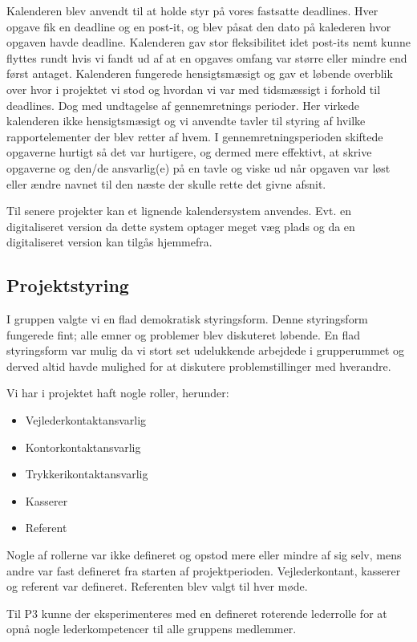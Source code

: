 Kalenderen blev anvendt til at holde styr p\aa{} vores fastsatte deadlines. Hver opgave fik en deadline og en post-it, og blev p\aa{}sat den dato p\aa{} kalederen hvor opgaven havde deadline.
Kalenderen gav stor fleksibilitet idet post-its nemt kunne flyttes rundt hvis vi fandt ud af at en opgaves omfang var st\o{}rre eller mindre end f\o{}rst antaget.
Kalenderen fungerede hensigtsm\ae{}sigt og gav et l\o{}bende overblik over hvor i projektet vi stod og hvordan vi var med tidsm\ae{}ssigt i forhold til deadlines. 
Dog med undtagelse af gennemretnings perioder.
Her virkede kalenderen ikke hensigtsm\ae{}sigt og vi anvendte tavler til styring af hvilke rapportelementer der blev retter af hvem.
I gennemretningsperioden skiftede opgaverne hurtigt s\aa{} det var hurtigere, og dermed mere effektivt, at skrive opgaverne og den/de ansvarlig(e) p\aa{} en tavle og viske ud n\aa{}r opgaven var l\o{}st eller \ae{}ndre navnet til den n\ae{}ste der skulle rette det givne afsnit.

Til senere projekter kan et lignende kalendersystem anvendes. Evt. en digitaliseret version da dette system optager meget v\ae{}g plads og da en digitaliseret version kan tilg\aa{}s hjemmefra. 

\subsection{Projektstyring}
I gruppen valgte vi en flad demokratisk styringsform. Denne styringsform fungerede fint; alle emner og problemer blev diskuteret l\o{}bende. En flad styringsform var mulig da vi stort set udelukkende arbejdede i grupperummet og derved altid havde mulighed for at diskutere problemstillinger med hverandre. 

Vi har i projektet haft nogle roller, herunder:
\begin{itemize}
\item Vejlederkontaktansvarlig
\item Kontorkontaktansvarlig
\item Trykkerikontaktansvarlig
\item Kasserer
\item Referent
\end{itemize}
Nogle af rollerne var ikke defineret og opstod mere eller mindre af sig selv, mens andre var fast defineret fra starten af projektperioden. Vejlederkontant, kasserer og referent var defineret. Referenten blev valgt til hver m\o{}de. 

Til P3 kunne der eksperimenteres med en defineret roterende lederrolle for at opn\aa{} nogle lederkompetencer til alle gruppens medlemmer. 






